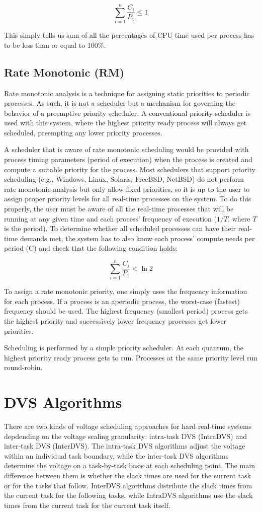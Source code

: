 \documentclass[10pt,article]{IEEEtran}
\begin{document}
$$\sum_{i = 1}^{n} \frac{C_i}{P_1} \leq 1$$

This simply tells us sum of all the percentages of CPU time used per process has to be less than or equal to 100\%. 

\subsection{Rate Monotonic (RM)}
 Rate monotonic analysis is a technique for assigning static priorities to periodic processes. As such, it is not a scheduler but a mechanism for governing the behavior of a preemptive priority scheduler. A conventional priority scheduler is used with this system, where the highest priority ready process will always get scheduled, preempting any lower priority processes.

A scheduler that is aware of rate monotonic scheduling would be provided with process timing parameters (period of execution) when the process is created and compute a suitable priority for the process. Most schedulers that support priority scheduling (e.g., Windows, Linux, Solaris, FreeBSD, NetBSD) do not perform rate monotonic analysis but only allow fixed priorities, so it is up to the user to assign proper priority levels for all real-time processes on the system. To do this properly, the user must be aware of all the real-time processes that will be running at any given time and each process' frequency of execution ($1/T$, where $T$ is the period). To determine whether all scheduled processes can have their real-time demands met, the system has to also know each process' compute needs per period (C) and check that the following condition holds: 

$$\sum_{i = 1}^{n} \frac{C_i}{P_1} < \ln 2$$

To assign a rate monotonic priority, one simply uses the frequency information for each process. If a process is an aperiodic process, the worst-case (fastest) frequency should be used. The highest frequency (smallest period) process gets the highest priority and successively lower frequency processes get lower priorities.

Scheduling is performed by a simple priority scheduler. At each quantum, the highest priority ready process gets to run. Processes at the same priority level run round-robin.

\section{DVS Algorithms}
There are two kinds of voltage scheduling approaches for hard real-time systems depdending on the voltage scaling granularity: intra-task DVS (IntraDVS) and inter-task DVS (InterDVS). The intra-task DVS algorithms adjust the voltage within an individual task boundary, while the inter-task DVS algorithms determine the voltage on a task-by-task basis at each scheduling point. The main difference between them is whether the slack times are used for the current task or for the tasks that follow.  InterDVS algorithms distribute the slack times from the current task for the following tasks, while IntraDVS algorithms use the slack times from the current task for the current task itself.
\end{document}
